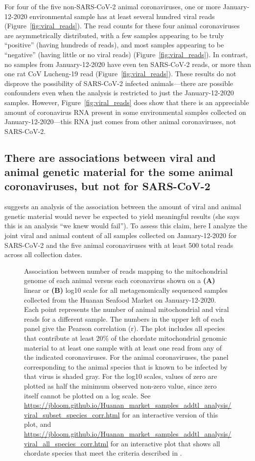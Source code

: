 \documentclass[9pt,onecolumn,twoside]{gsajnl_modified}
\begin{document}
For four of the five non-SARS-CoV-2 animal coronaviruses, one or more January-12-2020 environmental sample has at least several hundred viral reads (Figure~\ref{fig:viral_reads}).
The read counts for these four animal coronaviruses are asymmetrically distributed, with a few samples appearing to be truly ``positive'' (having hundreds of reads), and most samples appearing to be ``negative'' (having little or no viral reads) (Figure~\ref{fig:viral_reads}).
In contrast, no samples from January-12-2020 have even ten SARS-CoV-2 reads, or more than one rat CoV Lucheng-19 read (Figure~\ref{fig:viral_reads}).
These results do not disprove the possibility of SARS-CoV-2 infected animals---there are possible confounders even when the analysis is restricted to just the January-12-2020 samples.
However, Figure~\ref{fig:viral_reads} does show that there is an appreciable amount of coronavirus RNA present in some environmental samples collected on January-12-2020---this RNA just comes from other animal coronaviruses, not SARS-CoV-2.

\subsection{There are associations between viral and animal genetic material for the some animal coronaviruses, but not for SARS-CoV-2}
\citet{debarre2024what} suggests an analysis of the association between the amount of viral and animal genetic material would never be expected to yield meaningful results (she says this is an analysis ``we knew would fail'').
To assess this claim, here I analyze the joint viral and animal content of all samples collected on January-12-2020 for SARS-CoV-2 and the five animal coronaviruses with at least 500 total reads across all collection dates.

\begin{figure*}
\caption{
Association between number of reads mapping to the mitochondrial genome of each animal versus each coronavirus shown on a {\bf (A)} linear or {\bf (B)} log10 scale for all metagenomically sequenced samples collected from the Huanan Seafood Market on January-12-2020.
Each point represents the number of animal mitochondrial and viral reads for a different sample.
The numbers in the upper left of each panel give the Pearson correlation (r).
The plot includes all species that contribute at least 20\% of the chordate mitochondrial genomic material to at least one sample with at least one read from any of the indicated coronaviruses.
For the animal coronaviruses, the panel corresponding to the animal species that is known to be infected by that virus is shaded gray.
For the log10 scales, values of zero are plotted as half the minimum observed non-zero value, since zero itself cannot be plotted on a log scale.
See \url{https://jbloom.github.io/Huanan_market_samples_addtl_analysis/viral_subset_species_corr.html} for an interactive version of this plot, and \url{https://jbloom.github.io/Huanan_market_samples_addtl_analysis/viral_all_species_corr.html} for an interactive plot that shows all chordate species that meet the criteria described in \cite{bloom2023association}.
\label{fig:viral_species_corr}
}
\end{figure*}
\end{document}
